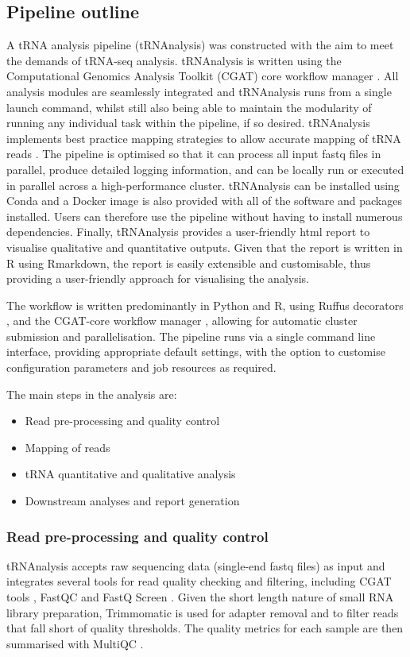 \subsection{Pipeline outline}
A tRNA analysis pipeline (tRNAnalysis) was constructed with the aim to meet the demands of tRNA-seq analysis.
tRNAnalysis is written using the Computational Genomics Analysis Toolkit (CGAT) core workflow manager \cite{cribbs2019cgat}.
All analysis modules are seamlessly integrated and tRNAnalysis runs from a single launch command, whilst still also being able to maintain the modularity of running any individual task within the pipeline, if so desired.
tRNAnalysis implements best practice mapping strategies to allow accurate mapping of tRNA reads \cite{hoffmann2018accurate}.
The pipeline is optimised so that it can process all input fastq files in parallel, produce detailed logging information, and can be locally run or executed in parallel across a high-performance cluster.
tRNAnalysis can be installed using Conda and a Docker image is also provided with all of the software and packages installed.
Users can therefore use the pipeline without having to install numerous dependencies.
Finally, tRNAnalysis provides a user-friendly html report to visualise qualitative and quantitative outputs.
Given that the report is written in R using Rmarkdown, the report is easily extensible and customisable, thus providing a user-friendly approach for visualising the analysis.

The workflow is written predominantly in Python and R, using Ruffus decorators \cite{goodstadt2010ruffus}, and the CGAT-core workflow manager \cite{cribbs2019cgat}, allowing for automatic cluster submission and parallelisation.
The pipeline runs via a single command line interface, providing appropriate default settings, with the option to customise configuration parameters and job resources as required.

The main steps in the analysis are:
\begin{itemize}
  \item Read pre-processing and quality control
  \item Mapping of reads
  \item tRNA quantitative and qualitative analysis
  \item Downstream analyses and report generation
\end{itemize}

\subsubsection{Read pre-processing and quality control}
tRNAnalysis accepts raw sequencing data (single-end fastq files) as input and integrates several tools for read quality checking and filtering, including CGAT tools \cite{sims2014cgat}, FastQC \cite{andrewfastqc} and FastQ Screen \cite{wingett2018fastq}.
Given the short length nature of small RNA library preparation, Trimmomatic \cite{bolger2014trimmomatic} is used for adapter removal and to filter reads that fall short of quality thresholds.
The quality metrics for each sample are then summarised with MultiQC \cite{ewels2016multiqc}.

